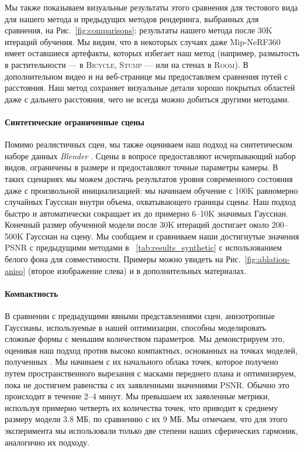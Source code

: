 Мы также показываем визуальные результаты этого сравнения для тестового вида для нашего метода и предыдущих методов рендеринга, выбранных для сравнения, на Рис.~\ref{fig:comparisons}; результаты нашего метода после 30K итераций обучения. Мы видим, что в некоторых случаях даже Mip-NeRF360 имеет оставшиеся артефакты, которых избегает наш метод (например, размытость в растительности — в \textsc{Bicycle, Stump} — или на стенах в \textsc{Room}).
В дополнительном видео и на веб-странице мы предоставляем сравнения путей с расстояния. Наш метод сохраняет визуальные детали хорошо покрытых областей даже с дальнего расстояния, чего не всегда можно добиться другими методами.

\paragraph{Синтетические ограниченные сцены}
Помимо реалистичных сцен, мы также оцениваем наш подход на синтетическом наборе данных \emph{Blender} \cite{mildenhall2020nerf}. Сцены в вопросе предоставляют исчерпывающий набор видов, ограничены в размере и предоставляют точные параметры камеры. В таких сценариях мы можем достичь результатов уровня современного состояния даже с произвольной инициализацией: мы начинаем обучение с 100K равномерно случайных Гауссиан внутри объема, охватывающего границы сцены. Наш подход быстро и автоматически сокращает их до примерно 6--10K значимых Гауссиан. Конечный размер обученной модели после 30K итераций достигает около 200--500K Гауссиан на сцену. Мы сообщаем и сравниваем наши достигнутые значения PSNR с предыдущими методами в ~\ref{tab:results_synthetic} с использованием белого фона для совместимости. Примеры можно увидеть на Рис.~\ref{fig:ablation-aniso} (второе изображение слева) и в дополнительных материалах. 

\paragraph{Компактность}
В сравнении с предыдущими явными представлениями сцен, анизотропные Гауссианы, используемые в нашей оптимизации, способны моделировать сложные формы с меньшим количеством параметров.
Мы демонстрируем это, оценивая наш подход против высоко компактных, основанных на точках моделей, полученных \cite{zhang2022}.
Мы начинаем с их начального облака точек, которое получено путем пространственного вырезания с масками переднего плана %
и оптимизируем, пока не достигнем равенства с их заявленными значениями PSNR. Обычно это происходит в течение 2--4 минут. Мы превышаем их заявленные метрики, используя примерно четверть их количества точек, что приводит к среднему размеру модели 3.8 МБ, по сравнению с их 9 МБ. Мы отмечаем, что для этого эксперимента мы использовали только две степени наших сферических гармоник, аналогично их подходу.

